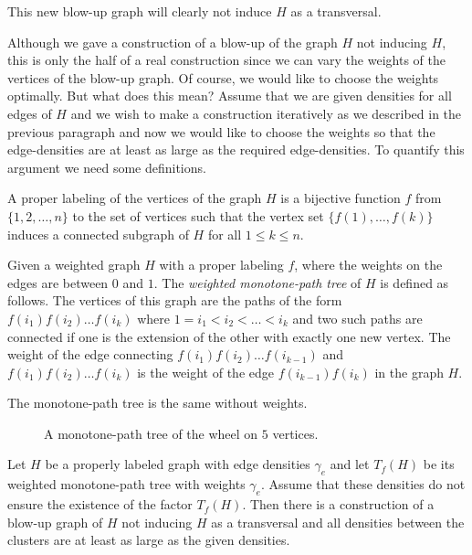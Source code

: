 \documentclass[12pt,a4paper]{amsart}
\numberwithin{equation}{section}
\begin{document}
This new blow-up graph will clearly not induce $H$ as a transversal.

Although we gave a construction of a blow-up of the graph $H$ not inducing
$H$, this is only the half of a real construction since we can vary the weights
of the vertices of the blow-up graph. Of course, we would like to choose the
weights optimally. But what does this mean? Assume that we are given densities
for all edges of $H$ and we wish to make a construction iteratively as we
described in the previous paragraph and now we would like to choose the
weights so that the edge-densities are at least as large as the required
edge-densities. To quantify this argument we need some definitions.
\bigskip

\begin{defn} \label{SD1} A proper labeling of the vertices of the graph $H$ is
  a bijective function $f$ from $\{1,2,\dots ,n\}$ to the set of vertices such
  that the vertex set $\{f(1),\dots ,f(k)\}$ induces a connected subgraph of
  $H$ for all $1\leq k\leq n$.
\end{defn}

\begin{defn} \label{SD2} Given a weighted graph $H$ with a proper labeling $f$,
  where  the weights on the edges are between $0$ and $1$. The \textit{weighted
    monotone-path tree} of $H$ is defined as follows. The vertices of this
  graph  are the paths of the form $f(i_1)f(i_2)\dots f(i_k)$ where
  $1=i_1<i_2<\dots <i_k$ and two such paths are connected if one is the
  extension of the other with exactly one new vertex. The weight of the edge
  connecting 
  $f(i_1)f(i_2)\dots f(i_{k-1})$ and $f(i_1)f(i_2)\dots f(i_k)$ is the weight
  of the edge $f(i_{k-1})f(i_k)$ in the graph $H$.

The monotone-path tree is the same without weights.
\end{defn} 

 \begin{figure}[h!] \label{mpt2}
\begin{center}
\caption{A
  monotone-path tree of the wheel on $5$ vertices.}   
\end{center}
\end{figure}

\begin{theorem} \label{ST1} Let $H$ be  a properly labeled graph with edge
  densities $\gamma_e$ and 
  let $T_f(H)$ be its weighted monotone-path tree with weights
  $\gamma_e$. Assume that   these densities do not ensure the existence of the
  factor $T_f(H)$. Then there is a construction of a blow-up graph of $H$ not
  inducing $H$ as a transversal and all  densities between the clusters are at
  least as large as the given densities.
\end{theorem}
\end{document}

